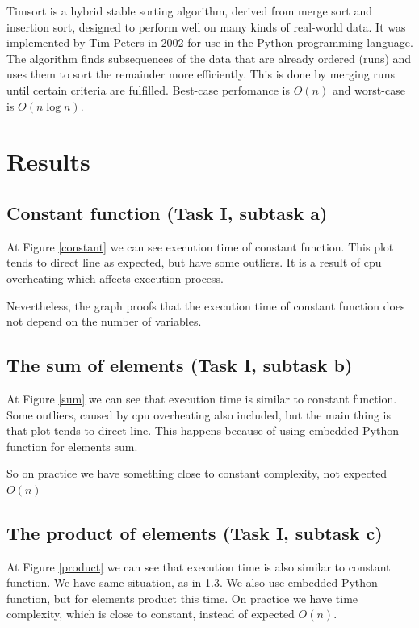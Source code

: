 \documentclass[a4paper,article,14pt]{extarticle}
\begin{document}
	Timsort is a hybrid stable sorting algorithm, derived from merge sort and insertion sort, designed to perform well on many kinds of real-world data. It was implemented by Tim Peters in 2002 for use in the Python programming language. The algorithm finds subsequences of the data that are already ordered (runs) and uses them to sort the remainder more efficiently. This is done by merging runs until certain criteria are fulfilled. Best-case perfomance is $O(n)$ and worst-case is $O(n\log n)$.
	
	\section{Results}
	\subsection{Constant function (Task I, subtask a)}
	
	At Figure \ref{constant} we can see execution time of constant function. This plot tends to direct line as expected, but have some outliers. It is a result of cpu overheating which affects execution process.
	
	Nevertheless, the graph proofs that the execution time of constant function does not depend on the number of variables.
	
	\subsection{The sum of elements (Task I, subtask b)}
	
	At Figure \ref{sum} we can see that execution time is similar to constant function. Some outliers, caused by cpu overheating also included, but the main thing is that plot tends to direct line. This happens because of using embedded Python function for elements sum. 
	
	So on practice we have something close to constant complexity, not expected $O(n)$
	
	\subsection{The product of elements (Task I, subtask c)}\label{sub:C}
	
	At Figure \ref{product} we can see that execution time is also similar to constant function. We have same situation, as in \ref{sub:C}. We also use embedded Python function, but for elements product this time. 
	On practice we have time complexity, which is close to constant, instead of expected $O(n)$.
	
\end{document}
